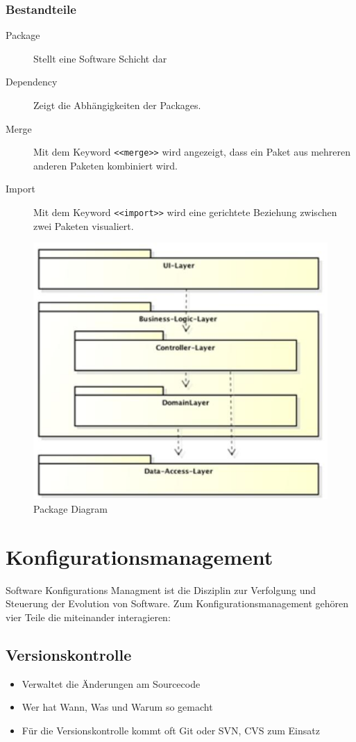 \subsubsection{Bestandteile}
\begin{description}
	\item[Package] Stellt eine Software Schicht dar
	\item[Dependency] Zeigt die Abhängigkeiten der Packages.
	\item[Merge] Mit dem Keyword \lstinline|<<merge>>| wird angezeigt, dass ein Paket aus mehreren anderen Paketen kombiniert wird.
	\item[Import] Mit dem Keyword \lstinline|<<import>>| wird eine gerichtete Beziehung zwischen zwei Paketen visualiert.
\end{description}
\begin{figure}[h]
	\centering
	\includegraphics[width=0.7\linewidth]{images/package_diagram}
	\caption{Package Diagram}
	\label{fig:packagediagram}
\end{figure}

\section{Konfigurationsmanagement}
Software Konfigurations Managment ist die Disziplin zur Verfolgung und Steuerung der Evolution von Software. Zum Konfigurationsmanagement gehören vier Teile die miteinander interagieren:

\subsection{Versionskontrolle}
\begin{itemize}
	\item Verwaltet die Änderungen am Sourcecode
	\item Wer hat Wann, Was und Warum so gemacht
	\item Für die Versionskontrolle kommt oft Git oder SVN, CVS zum Einsatz
\end{itemize}


